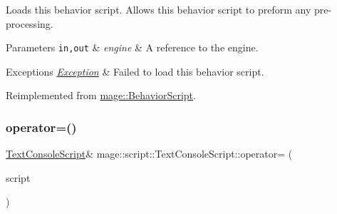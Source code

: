 Loads this behavior script. Allows this behavior script to preform any pre-\/processing.


\begin{DoxyParams}[1]{Parameters}
\mbox{\tt in,out}  & {\em engine} & A reference to the engine. \\
\hline
\end{DoxyParams}

\begin{DoxyExceptions}{Exceptions}
{\em \mbox{\hyperlink{classmage_1_1_exception}{Exception}}} & Failed to load this behavior script. \\
\hline
\end{DoxyExceptions}


Reimplemented from \mbox{\hyperlink{classmage_1_1_behavior_script_ae7864876b2ffb1d1d8d8a56e3099f1f2}{mage\+::\+Behavior\+Script}}.

\mbox{\label{classmage_1_1script_1_1_text_console_script_a68af2a144f641c9813b333544fe3562a}} 
\subsubsection{\texorpdfstring{operator=()}{operator=()}\hspace{0.1cm}{\footnotesize\ttfamily [1/2]}}
{\footnotesize\ttfamily \mbox{\hyperlink{classmage_1_1script_1_1_text_console_script}{Text\+Console\+Script}}\& mage\+::script\+::\+Text\+Console\+Script\+::operator= (\begin{DoxyParamCaption}\item[{const \mbox{\hyperlink{classmage_1_1script_1_1_text_console_script}{Text\+Console\+Script}} \&}]{script }\end{DoxyParamCaption})\hspace{0.3cm}{\ttfamily [delete]}}

\mbox{\label{classmage_1_1script_1_1_text_console_script_ae8560dece8d507ee338dda68e3176fed}} 
